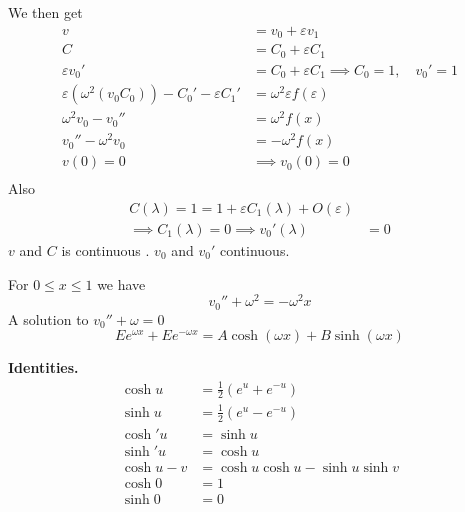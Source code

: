 \documentclass{article}
\theoremstyle{remark}
\newcommand{\newpara}
  {
  \vskip 0.4cm
  }
\begin{document}
We then get \[
\begin{split}
  v &=  v_{0} + \varepsilon  v_{1}  \\
  C &=  C_{0} + \varepsilon C_{1} \\
  \varepsilon  v_{0}'  &=  C_{0} + \varepsilon  C_{1} \implies  C_{0} = 1 , \quad  v_{0}'  = 1  \\
  \varepsilon \left( \omega ^2 \left( v_{0} C_{0} \right)  \right) - C_{0}'  - \varepsilon  C_{1}'   & = \omega ^2 \varepsilon  f\left( \varepsilon  \right) \\
  \omega ^2 v_{0} - v_{0}''  &=  \omega ^2 f\left( x \right) \\
  v_{0}''  - \omega ^2 v_{0}  & = - \omega ^2 f\left( x \right) \\
  v\left( 0 \right) = 0  &  \implies  v_{0}\left( 0 \right) = 0 \\
\end{split} 
\] 
Also 
\[
\begin{split}
C\left( \lambda  \right) = 1 = 1 + \varepsilon C_{1} \left( \lambda   \right) + O\left( \varepsilon  \right)  \\
\implies  C_{1} \left( \lambda  \right) = 0    \implies  v_{0} '  \left( \lambda  \right)  & = 0
\end{split} 
\] 
$v$ and $C$ is continuous . $v_{0}$ and $v_{0}' $ continuous. 

\newpara
For $0 \le x \le 1$  we have \[
v_{0}''  + \omega ^2   = - \omega ^2 x 
\] 
A solution to $ v_{0}''  + \omega  = 0$ \[
E e^{\omega x} + E e^{- \omega  x} = A \cosh \left( \omega  x \right) + B \sinh \left( \omega x \right)
\] 

\begin{tcolorbox}
\textbf{Identities.}  \[
  \begin{split}
\cosh u &=  \frac{1}{2} \left( e^{u} + e^{-u} \right) \\
\sinh u &=  \frac{1}{2} \left( e^{u} - e^{-u} \right) \\
\cosh' u  & = \sinh u \\
\sinh'  u  &  = \cosh u \\
\cosh u - v &=  \cosh u \cosh u  - \sinh u \sinh v \\
\cosh 0 &=  1 \\
\sinh 0  & = 0
  \end{split} 
\] 
\end{tcolorbox}
\end{document}
